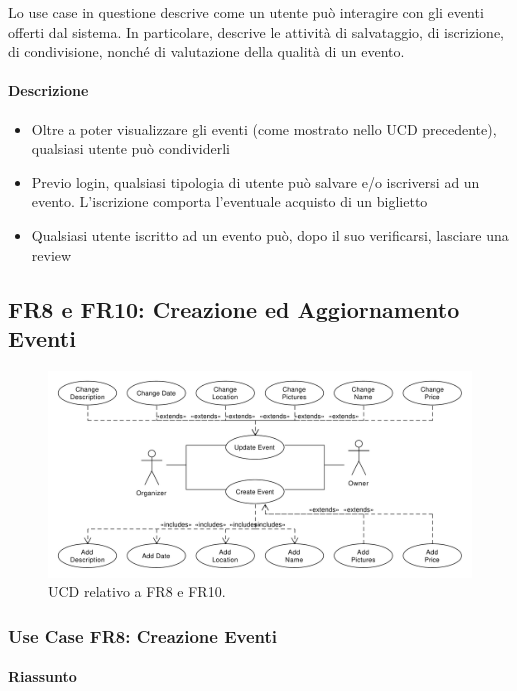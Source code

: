 \documentclass[9pt]{extarticle}
\begin{document}
Lo use case in questione descrive come un utente può interagire con gli eventi offerti dal sistema. In particolare, descrive le attività di salvataggio, di iscrizione, di condivisione, nonché di valutazione della qualità di un evento.

\paragraph{Descrizione}

\begin{itemize}
	\item Oltre a poter visualizzare gli eventi (come mostrato nello UCD precedente), qualsiasi utente può condividerli
	\item Previo login, qualsiasi tipologia di utente può salvare e/o iscriversi ad un evento. L'iscrizione comporta l'eventuale acquisto di un biglietto
	\item Qualsiasi utente iscritto ad un evento può, dopo il suo verificarsi, lasciare una review
\end{itemize}


\subsection{FR8 e FR10: Creazione ed Aggiornamento Eventi}

\begin{figure}[!htb]
	\centering
	\includegraphics[width=\linewidth]{./images/FR8-10.pdf}
	\caption{UCD relativo a FR8 e FR10.}
	\label{fig:UCD_FR8-10}
\end{figure}

\subsubsection*{Use Case FR8: Creazione Eventi}

\paragraph{Riassunto}
\end{document}
